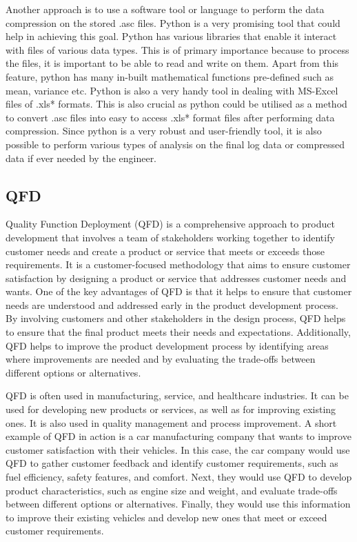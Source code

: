Another approach is to use a software tool or language to perform the data compression on the stored .asc files. Python is a very promising tool that could help in achieving this goal. Python has various libraries that enable it interact with files of various data types. This is of primary importance because to process the files, it is important to be able to read and write on them. Apart from this feature, python has many in-built mathematical functions pre-defined such as mean, variance etc. Python is also a very handy tool in dealing with MS-Excel files of .xls* formats. This is also crucial as python could be utilised as a method to convert .asc files into easy to access .xls* format files after performing data compression. Since python is a very robust and user-friendly tool, it is also possible to perform various types of analysis on the final log data or compressed data if ever needed by the engineer. 
\newpage
\subsection{QFD}

Quality Function Deployment (QFD) is a comprehensive approach to product development that involves a team of stakeholders working together to identify customer needs and create a product or service that meets or exceeds those requirements. It is a customer-focused methodology that aims to ensure customer satisfaction by designing a product or service that addresses customer needs and wants. One of the key advantages of QFD is that it helps to ensure that customer needs are understood and addressed early in the product development process. By involving customers and other stakeholders in the design process, QFD helps to ensure that the final product meets their needs and expectations. Additionally, QFD helps to improve the product development process by identifying areas where improvements are needed and by evaluating the trade-offs between different options or alternatives.

QFD is often used in manufacturing, service, and healthcare industries. It can be used for developing new products or services, as well as for improving existing ones. It is also used in quality management and process improvement. A short example of QFD in action is a car manufacturing company that wants to improve customer satisfaction with their vehicles. In this case, the car company would use QFD to gather customer feedback and identify customer requirements, such as fuel efficiency, safety features, and comfort. Next, they would use QFD to develop product characteristics, such as engine size and weight, and evaluate trade-offs between different options or alternatives. Finally, they would use this information to improve their existing vehicles and develop new ones that meet or exceed customer requirements.

